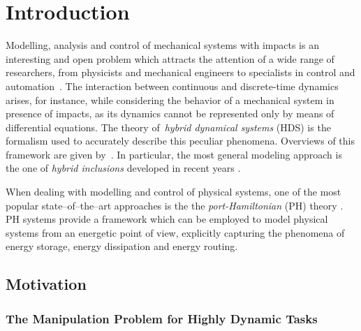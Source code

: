 \chapter{{Introduction}}
\label{chap:introduction}
\minitoc

\thispagestyle{empty}

\newpage
Modelling, analysis and control of mechanical systems with impacts is an interesting and open problem which attracts the attention of a wide range of researchers, from physicists and mechanical engineers to specialists in control and automation~\cite{brogliato1999nonsmooth,stronge2018impact}.
The interaction between continuous and discrete-time dynamics arises, for instance, while considering the behavior of a mechanical system in presence of impacts, as its dynamics cannot be represented only by means of differential equations. The theory of~\textit{hybrid dynamical systems} (HDS) is the formalism used to accurately describe this peculiar phenomena. Overviews of this framework are given by~\cite{van2000introduction,haddad2006impulsive}. In particular, the most general modeling approach is the one of \textit{hybrid inclusions} developed in recent years \cite{goebel2009hybrid}.

When dealing with modelling and control of physical systems, one of the most popular state--of--the--art approaches is the the \textit{port-Hamiltonian} (PH) theory \cite{secchi2007control,van2014port}. PH systems provide a framework which can be employed to model physical systems from an energetic point of view, explicitly capturing the phenomena of energy storage, energy dissipation and energy routing. 

\section{Motivation}
\subsection{The Manipulation Problem for Highly Dynamic Tasks}
